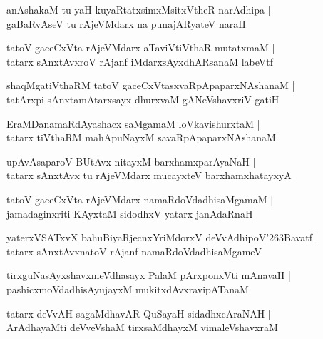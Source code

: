 \documentclass[twoside,12pt,openright]{book}
\def\S{\char'263}
\newcounter{shloka}[chapter]
\begin{document}
\begin{shloka}
anAshakaM tu yaH kuyaRtatxsimxMsitxVtheR narAdhipa |\\
gaBaRvAseV tu rAjeVMdarx na punajARyateV naraH
\end{shloka}

\begin{shloka}
tatoV gaceCxVta rAjeVMdarx aTaviVtiVthaR mutatxmaM |\\
tatarx sAnxtAvxroV rAjanf iMdarxsAyxdhARsanaM labeVtf
\end{shloka}

\begin{shloka}
shaqMgatiVthaRM tatoV gaceCxVtasxvaRpApaparxNAshanaM |\\
tatArxpi sAnxtamAtarxsayx dhurxvaM gANeVshavxriV gatiH
\end{shloka}


\begin{shloka}
EraMDanamaRdAyashacx saMgamaM loVkavishurxtaM |\\
tatarx tiVthaRM mahApuNayxM savaRpApaparxNAshanaM 
\end{shloka}

\begin{shloka}
upAvAsaparoV BUtAvx nitayxM barxhamxparAyaNaH |\\
tatarx sAnxtAvx tu rAjeVMdarx mucayxteV barxhamxhatayxyA
\end{shloka}

\begin{shloka}
tatoV gaceCxVta rAjeVMdarx namaRdoVdadhisaMgamaM |\\
jamadaginxriti KAyxtaM sidodhxV yatarx janAdaRnaH 
\end{shloka}

\begin{shloka}
yaterxVSATxvX bahuBiyaRjecnxYriMdorxV deVvAdhipoV\S Bavatf |\\
tatarx sAnxtAvxnatoV rAjanf namaRdoVdadhisaMgameV 
\end{shloka}

\begin{shloka}
tirxguNasAyxshavxmeVdhasayx PalaM pArxponxVti mAnavaH |\\
pashicxmoVdadhisAyujayxM mukitxdAvxravipATanaM 
\end{shloka}

\begin{shloka}
tatarx deVvAH sagaMdhavAR QuSayaH sidadhxcAraNAH |\\
ArAdhayaMti deVveVshaM tirxsaMdhayxM vimaleVshavxraM 
\end{shloka}
\end{document}
